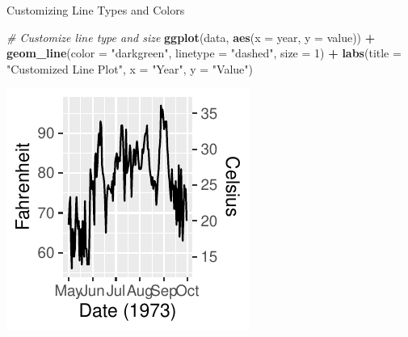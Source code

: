 \documentclass[
  ignorenonframetext,
]{beamer}
\newenvironment{Shaded}{\begin{snugshade}}{\end{snugshade}}
\newcommand{\AttributeTok}[1]{\textcolor[rgb]{0.13,0.29,0.53}{#1}}
\newcommand{\CommentTok}[1]{\textcolor[rgb]{0.56,0.35,0.01}{\textit{#1}}}
\newcommand{\DecValTok}[1]{\textcolor[rgb]{0.00,0.00,0.81}{#1}}
\newcommand{\FunctionTok}[1]{\textcolor[rgb]{0.13,0.29,0.53}{\textbf{#1}}}
\newcommand{\NormalTok}[1]{#1}
\newcommand{\SpecialCharTok}[1]{\textcolor[rgb]{0.81,0.36,0.00}{\textbf{#1}}}
\newcommand{\StringTok}[1]{\textcolor[rgb]{0.31,0.60,0.02}{#1}}
\begin{document}
\begin{frame}[fragile]{Customizing Line Types and Colors}
\label{customizing-line-types-and-colors}

\begin{Shaded}
\begin{Highlighting}[]
\CommentTok{\# Customize line type and size}
\FunctionTok{ggplot}\NormalTok{(data, }\FunctionTok{aes}\NormalTok{(}\AttributeTok{x =}\NormalTok{ year, }\AttributeTok{y =}\NormalTok{ value)) }\SpecialCharTok{+} \FunctionTok{geom\_line}\NormalTok{(}\AttributeTok{color =} \StringTok{"darkgreen"}\NormalTok{,}
    \AttributeTok{linetype =} \StringTok{"dashed"}\NormalTok{, }\AttributeTok{size =} \DecValTok{1}\NormalTok{) }\SpecialCharTok{+} \FunctionTok{labs}\NormalTok{(}\AttributeTok{title =} \StringTok{"Customized Line Plot"}\NormalTok{,}
    \AttributeTok{x =} \StringTok{"Year"}\NormalTok{, }\AttributeTok{y =} \StringTok{"Value"}\NormalTok{)}
\end{Highlighting}
\end{Shaded}

\begin{center}\includegraphics[width=0.5\linewidth]{Figs/unnamed-chunk-58-1} \end{center}
\end{frame}
\end{document}
